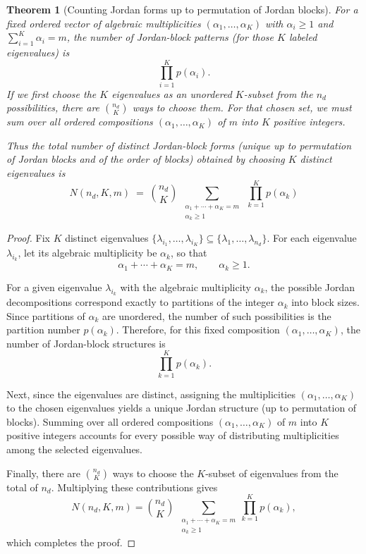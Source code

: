 \documentclass[11pt]{article}
\newtheorem{theorem}{Theorem}
\begin{document}
\begin{theorem}[Counting Jordan forms up to permutation of Jordan blocks]\label{thm:Counting Jordan Block Structures for Multiple Distinct Eigenvalues}
For a fixed ordered vector of algebraic multiplicities \((\alpha_1,\dots,\alpha_K)\) with \(\alpha_i\ge1\) and \(\sum\limits_{i=1}^K \alpha_i=m\),  
the number of Jordan-block patterns (for those \(K\) labeled eigenvalues) is
\[
\prod_{i=1}^K p(\alpha_i).
\]
If we first choose the \(K\) eigenvalues as an unordered \(K\)-subset from the \(n_d\) possibilities, there are \(\binom{n_d}{K}\) ways to choose them.  
For that chosen set, we must sum over all ordered compositions \((\alpha_1,\dots,\alpha_K)\) of \(m\) into \(K\) positive integers.  

Thus the total number of distinct Jordan-block forms (unique up to permutation of Jordan blocks and of the order of blocks) obtained by choosing \(K\) distinct eigenvalues is
\[
N(n_d,K,m)\;=\;\binom{n_d}{K}\;\sum_{\substack{\alpha_1+\cdots+\alpha_K=m \\ \alpha_k\ge1}}
\;\prod_{k=1}^K p(\alpha_k)
\]
\end{theorem}

\begin{proof}
%
Fix \(K\) distinct eigenvalues \(\{\lambda_{i_1},\dots,\lambda_{i_K}\}\subseteq\{\lambda_1,\dots,\lambda_{n_d}\}\).  
For each eigenvalue \(\lambda_{i_k}\), let its algebraic multiplicity be \(\alpha_k\), so that
\[
\alpha_1+\cdots+\alpha_K=m, \qquad \alpha_k \ge 1.
\]

For a given eigenvalue \(\lambda_{i_k}\) with the algebraic multiplicity \(\alpha_k\), the possible Jordan decompositions correspond exactly to partitions of the integer \(\alpha_k\) into block sizes.  
Since partitions of \(\alpha_k\) are unordered, the number of such possibilities is the partition number \(p(\alpha_k)\).  
Therefore, for this fixed composition \((\alpha_1,\dots,\alpha_K)\), the number of Jordan-block structures is
\[
\prod_{k=1}^K p(\alpha_k).
\]

Next, since the eigenvalues are distinct, assigning the multiplicities \((\alpha_1,\dots,\alpha_K)\) to the chosen eigenvalues yields a unique Jordan structure (up to permutation of blocks).  
Summing over all ordered compositions \((\alpha_1,\dots,\alpha_K)\) of \(m\) into \(K\) positive integers accounts for every possible way of distributing multiplicities among the selected eigenvalues.

Finally, there are \(\binom{n_d}{K}\) ways to choose the \(K\)-subset of eigenvalues from the total of \(n_d\).  
Multiplying these contributions gives
\[
N(n_d,K,m)=\binom{n_d}{K}\;\sum_{\substack{\alpha_1+\cdots+\alpha_K=m \\ \alpha_k\ge 1}}
\prod_{k=1}^K p(\alpha_k),
\]
which completes the proof.
%
\end{proof}
\end{document}
